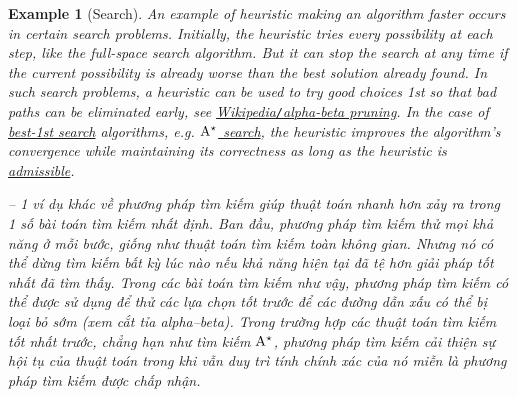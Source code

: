 \documentclass{article}
\newtheorem{example}{Example}
\begin{document}
\begin{example}[Search]
	An example of heuristic making an algorithm faster occurs in certain search problems. Initially, the heuristic tries every possibility at each step, like the full-space search algorithm. But it can stop the search at any time if the current possibility is already worse than the best solution already found. In such search problems, a heuristic can be used to try good choices 1st so that bad paths can be eliminated early, see \href{https://en.wikipedia.org/wiki/Alpha%E2%80%93beta_pruning}{Wikipedia{\tt/}alpha-beta pruning}. In the case of \href{https://en.wikipedia.org/wiki/Best-first_search}{best-1st search} algorithms, e.g. \href{https://en.wikipedia.org/wiki/A*_search}{$\rm A^\star$ search}, the heuristic improves the algorithm's convergence while maintaining its correctness as long as the heuristic is \href{https://en.wikipedia.org/wiki/Admissible_heuristic}{admissible}.
	
	-- 1 ví dụ khác về phương pháp tìm kiếm giúp thuật toán nhanh hơn xảy ra trong 1 số bài toán tìm kiếm nhất định. Ban đầu, phương pháp tìm kiếm thử mọi khả năng ở mỗi bước, giống như thuật toán tìm kiếm toàn không gian. Nhưng nó có thể dừng tìm kiếm bất kỳ lúc nào nếu khả năng hiện tại đã tệ hơn giải pháp tốt nhất đã tìm thấy. Trong các bài toán tìm kiếm như vậy, phương pháp tìm kiếm có thể được sử dụng để thử các lựa chọn tốt trước để các đường dẫn xấu có thể bị loại bỏ sớm (xem cắt tỉa alpha–beta). Trong trường hợp các thuật toán tìm kiếm tốt nhất trước, chẳng hạn như tìm kiếm $\rm A^\star$, phương pháp tìm kiếm cải thiện sự hội tụ của thuật toán trong khi vẫn duy trì tính chính xác của nó miễn là phương pháp tìm kiếm được chấp nhận.
\end{example}
\end{document}
